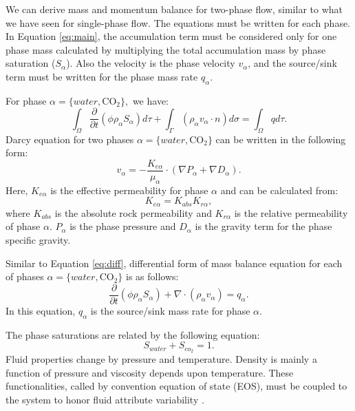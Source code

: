 We can derive mass and momentum balance for two-phase flow, similar to what we
have seen for single-phase flow. The equations must be written for each phase.
In
Equation \ref{eq:main}, the accumulation term must be considered only for one
phase mass calculated by multiplying the total accumulation mass by phase
saturation ($ S_{\alpha}$). Also the velocity is the phase velocity
$v_{\alpha}$, and the source/sink term must be written for the phase mass rate
$q_{\alpha}$.

For phase $\alpha=\{water, \mbox{CO}_2\},$ we have:
\begin{equation}
  \int_{\Omega}\frac{\partial}{\partial t}(\phi\rho_{\alpha}
S_{\alpha})d\tau+\int_{\Gamma}(\rho_{\alpha} v_{\alpha} \cdot
n)d\sigma=\int_{\Omega}qd\tau.
  \label{eq:2phs}
\end{equation} Darcy equation for two phases $\alpha=\{water, \mbox{CO}_2\}$
can be written in the following form: 
\begin{equation}
  v_{\alpha}=-\frac{K_{e\alpha}}{\mu_{\alpha}}\cdot
(\nabla{P_{\alpha}}+\nabla{D_{\alpha}}).
  \label{eq:D2phs}
\end{equation} Here, $K_{e\alpha}$ is the effective permeability for phase
$\alpha$ and can be calculated from:
\begin{equation}
 K_{e\alpha}=K_{abs}K_{r\alpha},
 \label{eq:Ke}
\end{equation} where $K_{abs}$ is the absolute rock permeability and
$K_{r\alpha}$ is the relative permeability of phase $\alpha$. $P_{\alpha}$ is
the phase pressure and $D_{\alpha}$ is the gravity term for the phase specific
gravity.



Similar to Equation \ref{eq:diff}, differential form of mass balance equation
for each of phases $\alpha=\{water,\mbox{CO}_2\}$ is as follows:
\begin{equation}
 \frac{\partial}{\partial t}(\phi\rho_{\alpha}S_{\alpha})+\nabla \cdot
(\rho_{\alpha} v_{\alpha})=q_{\alpha}.
 \label{eq:dif2p}
\end{equation}
 In this equation, $q_{\alpha}$ is the source/sink mass rate for phase $\alpha$.

 The phase saturations are related by the following equation:
\begin{equation}
  S_{water}+S_{co_2} = 1.
   \label{eq:sat}
\end{equation} Fluid properties change by pressure and temperature. Density is
mainly a function of pressure and viscosity depends upon temperature. These
functionalities, called by convention equation of state (EOS), must be coupled
to the system to honor fluid attribute variability
\cite{greenwood1969compressibility,duan2006equation}. 
  
